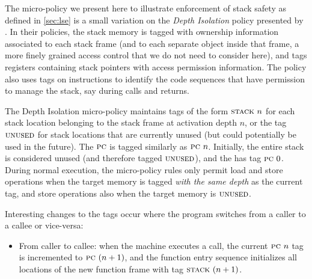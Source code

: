 \documentclass[acmsmall,review,anonymous]{acmart}\settopmatter{printfolios=true,printccs=false,printacmref=false}
\begin{document}
{{%

The micro-policy we present here to illustrate enforcement of stack
safety as defined in \cref{sec:lse} is a small variation
on the {\em Depth Isolation} policy presented by
\citet{DBLP:conf/sp/RoesslerD18}. In their policies,  the stack memory is tagged
with ownership information associated to each stack frame (and to each
separate object inside that frame, a more finely grained access
control that we do not need to consider here), and tags registers containing
stack pointers with access permission information. The policy also
uses tags on instructions to identify the code
sequences that have permission to manage the stack, say during calls and returns.

The Depth Isolation micro-policy maintains tags of the form $\textsc{stack} ~ n$ for
each stack location belonging to the stack frame at activation depth
$n$, or the tag $\textsc{unused}$ for stack locations that are currently
unused (but could potentially be used in the future).
%
The $\textsc{pc}$ is tagged similarly as $\textsc{pc} ~ n$.
%
Initially, the entire stack is considered unused (and therefore tagged
$\textsc{unused}$), and the {\PCname} has tag $\textsc{pc} ~ 0$.
%
During normal execution, the micro-policy rules only permit load and
store operations when the target memory is tagged {\em with the same
  depth} as the current {\PCname} tag, and store operations also when the
target memory is $\textsc{unused}$.

Interesting changes to the tags occur where the program switches from
a caller to a callee or vice-versa:

\begin{itemize}

\item From caller to callee: when the machine executes a call,
  the current
  $\textsc{pc} ~ n$ tag is incremented to $\textsc{pc} ~ (n + 1)$, and the function
  entry sequence initializes  all locations of the new function frame with
  tag $\textsc{stack} ~ (n + 1)$.


\end{itemize}}}
\end{document}
